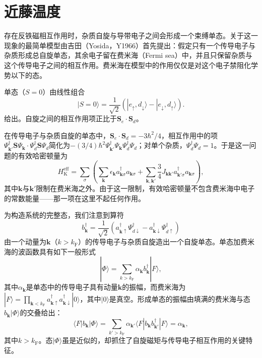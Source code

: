 \section{近藤温度}

存在反铁磁相互作用时，杂质自旋与导带电子之间会形成一个束缚单态。关于这一现象的最简单模型由吉田（Yosida，Y1966）首先提出：假定只有一个传导电子与杂质形成总自旋单态，其余电子留在费米海（Fermi sea）中，并且只保留杂质与这个传导电子之间的相互作用。费米海在模型中的作用仅仅是对这个电子禁阻化学势以下的态。

单态（$S=0$）由线性组合
\begin{equation*}
|S=0\rangle = \frac{1}{\sqrt{2}}\left(|e_{\uparrow},d_{\downarrow}\rangle-|e_{\downarrow},d_{\uparrow}\rangle\right).
\tag{8.74}
\end{equation*}
给出。自旋之间的相互作用项正比于$\mathbf{S}_e\cdot\mathbf{S}_d$。

在传导电子与杂质自旋的单态中，$\mathbf{S}_e\cdot\mathbf{S}_d=-3\hbar^2/4$，相互作用中的项$\Psi_{\mathbf{k}'}^{\dagger}\mathbf{S}\Psi_{\mathbf{k}}\cdot\Psi_d^{\dagger}\mathbf{S}\Psi_d$简化为$-(3/4)\hbar^2\Psi_{\mathbf{k}'}^{\dagger}\Psi_{\mathbf{k}}\Psi_d^{\dagger}\Psi_d$；对单个杂质，$\Psi_d^{\dagger}\Psi_d=1$。于是这一问题的有效哈密顿量为
\begin{equation*}
H_{\mathrm{K}}^{\mathrm{eff}} = \sum_{\sigma}\left(\sum_{\mathbf{k}}\epsilon_{\mathbf{k}}a_{\mathbf{k}\sigma}^{\dagger}a_{\mathbf{k}\sigma}+\sum_{\mathbf{k},\mathbf{k}'}\frac{3}{4}J_{\mathbf{k}\mathbf{k}'}a_{\mathbf{k}'\sigma}^{\dagger}a_{\mathbf{k}\sigma}\right),
\tag{8.75}
\end{equation*}
其中$\mathbf{k}$与$\mathbf{k}'$限制在费米海之外。由于这一限制，有效哈密顿量不包含费米海中电子的常数能量——那一项在这里不起任何作用。

为构造系统的完整态，我们注意到算符
\begin{equation*}
b_{\mathbf{k}}^{\dagger} = \frac{1}{\sqrt{2}}\left(a_{\mathbf{k}\uparrow}^{\dagger}\Psi_{d\downarrow}^{\dagger}-a_{\mathbf{k}\downarrow}^{\dagger}\Psi_{d\uparrow}^{\dagger}\right)
\tag{8.76}
\end{equation*}
由一个动量为$\mathbf{k}$（$k>k_{\mathrm{F}}$）的传导电子与杂质自旋造出一个自旋单态。单态加费米海的波函数具有如下一般形式
\begin{equation*}
|\Phi\rangle = \sum_{k>k_{\mathrm{F}}}\alpha_{\mathbf{k}}b_{\mathbf{k}}^{\dagger}|F\rangle,
\tag{8.77}
\end{equation*}
其中$\alpha_{\mathbf{k}}$是单态中的传导电子具有动量$\mathbf{k}$的振幅，而费米海为$|F\rangle=\prod_{\mathbf{k}<k_{\mathrm{F}}}a_{\mathbf{k}\uparrow}^{\dagger}a_{\mathbf{k}\downarrow}^{\dagger}|0\rangle$，其中$|0\rangle$是真空。形成单态的振幅由填满的费米海与态$b_{\mathbf{k}}|\Phi\rangle$的交叠给出：
\begin{equation*}
\langle F|b_{\mathbf{k}}|\Phi\rangle = \sum_{k'>k_{\mathrm{F}}}\alpha_{\mathbf{k}'}\langle F|b_{\mathbf{k}}b_{\mathbf{k}'}^{\dagger}|F\rangle = \alpha_{\mathbf{k}},
\tag{8.78}
\end{equation*}
其中$k>k_{\mathrm{F}}$。态$|\Phi\rangle$虽是近似的，却抓住了自旋磁矩与传导电子相互作用的关键特征。

